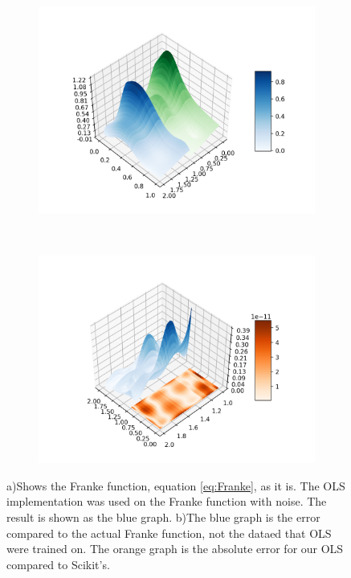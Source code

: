 \begin{figure}[H]
    \centering
    \begin{subfigure}{0.5\textwidth}
        \centering
        \includegraphics[width=\linewidth]{method/bilder/actual}
        \caption{}
    \end{subfigure}%
    ~
    \begin{subfigure}{0.5\textwidth}
        \centering
        \includegraphics[width=\linewidth]{method/bilder/error}
        \caption{}
    \end{subfigure}
    \caption{a)Shows the \color{green} Franke function\color{black}, equation \ref{eq:Franke}, as it is.
    The \color{blue}OLS implementation \color{black} was used on the Franke function with noise.
    The result is shown as the blue graph.
    b)The \color{blue}blue \color{black} graph is the error compared to the actual Franke function,
    not the dataed that OLS were trained on. The \color{orange} orange \color{black} graph is the absolute error
    for our OLS compared to Scikit's.}
    \label{fig:test}
\end{figure}

